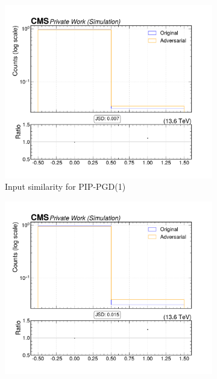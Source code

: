 \begin{figure}[htbp]
  \centering
  \begin{subfigure}[t]{0.32\textwidth}
    \includegraphics[width=\linewidth]{media/output/features/compare/combined_it_1/cmp_npf_arr_Npfcan_HadFrac.pdf}
    \caption*{Input similarity for PIP-PGD(1)}
  \end{subfigure}\hfill
  \begin{subfigure}[t]{0.32\textwidth}
    \includegraphics[width=\linewidth]{media/output/features/compare/combined_it_2/cmp_npf_arr_Npfcan_HadFrac.pdf}

\end{subfigure}
\end{figure}
